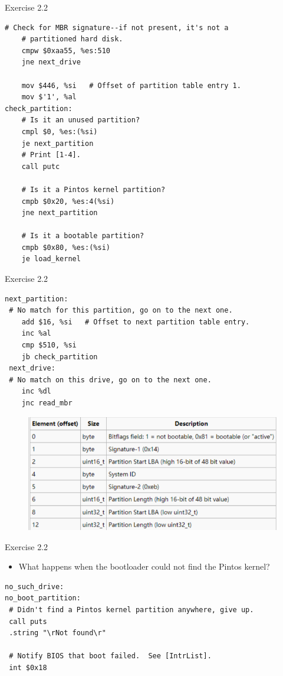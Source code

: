 \documentclass[14pt]{beamer}
\begin{document}
\begin{frame}[fragile]{Exercise 2.2}
    \begin{block}{}
        \begin{lstlisting}[language={[x86masm]Assembler}]
    # Check for MBR signature--if not present, it's not a
    # partitioned hard disk.
    cmpw $0xaa55, %es:510
    jne next_drive

    mov $446, %si   # Offset of partition table entry 1.
    mov $'1', %al
check_partition:
    # Is it an unused partition?
    cmpl $0, %es:(%si)
    je next_partition
    # Print [1-4].
    call putc

    # Is it a Pintos kernel partition?
    cmpb $0x20, %es:4(%si)
    jne next_partition

    # Is it a bootable partition?
    cmpb $0x80, %es:(%si)
    je load_kernel
        \end{lstlisting}
    \end{block}
\end{frame}
\begin{frame}[fragile]{Exercise 2.2}
    \begin{block}{}
        \begin{lstlisting}[language={[x86masm]Assembler}]
next_partition:
 # No match for this partition, go on to the next one.
    add $16, %si   # Offset to next partition table entry.
    inc %al
    cmp $510, %si
    jb check_partition
 next_drive:
 # No match on this drive, go on to the next one.
    inc %dl
    jnc read_mbr
        \end{lstlisting}
    \end{block}
    \begin{figure}
        \centering
        \includegraphics[width=0.6\linewidth]{figure/partition.png}
    \end{figure}
\end{frame}
\begin{frame}[fragile]{Exercise 2.2}
\begin{itemize}
    \item What happens when the bootloader could not find the Pintos kernel?
\end{itemize}
\begin{block}{}
    \begin{lstlisting}[language={[x86masm]Assembler}]
no_such_drive:
no_boot_partition:
 # Didn't find a Pintos kernel partition anywhere, give up.
 call puts
 .string "\rNot found\r"

 # Notify BIOS that boot failed.  See [IntrList].
 int $0x18
        \end{lstlisting}
    \end{block}
\end{frame}
\end{document}
